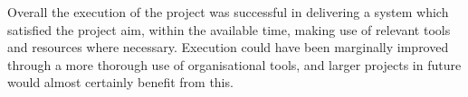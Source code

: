 Overall the execution of the project was successful in delivering a system which satisfied the project aim, within the available time, making use of relevant tools and resources where necessary. Execution could have been marginally improved through a more thorough use of organisational tools, and larger projects in future would almost certainly benefit from this.


